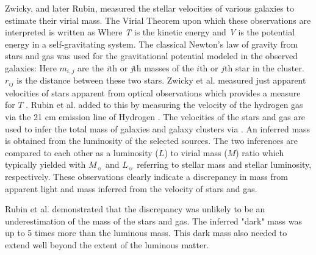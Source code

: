 Zwicky, and later Rubin, measured the stellar velocities of various galaxies to estimate their virial mass.
The Virial Theorem upon which these observations are interpreted is written as \virialtheorem
Where \textit{T} is the kinetic energy and \textit{V} is the potential energy in a self-gravitating system.
The classical Newton's law of gravity from stars and gas was used for the gravitational potential modeled in the observed galaxies:
\newtongravity
Here $m_{i,j}$ are the \textit{i}th or \textit{j}th masses of the $i$th or $j$th star in the cluster.
$r_{ij}$ is the distance between these two stars.
Zwicky et al. measured just apparent velocities of stars apparent from optical observations which provides a measure for $T$ \cite{Zwicky:1933}.
Rubin et al. added to this by measuring the velocity of the hydrogen gas via the 21 cm emission line of Hydrogen \cite{Rubin:1978}.
The velocities of the stars and gas are used to infer the total mass of galaxies and galaxy clusters via .
An inferred mass is obtained from the luminosity of the selected sources.
The two inferences are compared to each other as a luminosity ($L$) to virial mass ($M$) ratio which typically yielded \cite{Greene:cosmology_dm}
\masslightratio
with $M_{\sun}$ and $L_{\sun}$ referring to stellar mass and stellar luminosity, respectively.
These observations clearly indicate a discrepancy in mass from apparent light and mass inferred from the velocity of stars and gas.

Rubin et al. \cite{Rubin:1978} demonstrated that the discrepancy was unlikely to be an underestimation of the mass of the stars and gas.
The inferred "dark" mass was up to 5 times more than the luminous mass.
This dark mass also needed to extend well beyond the extent of the luminous matter.

